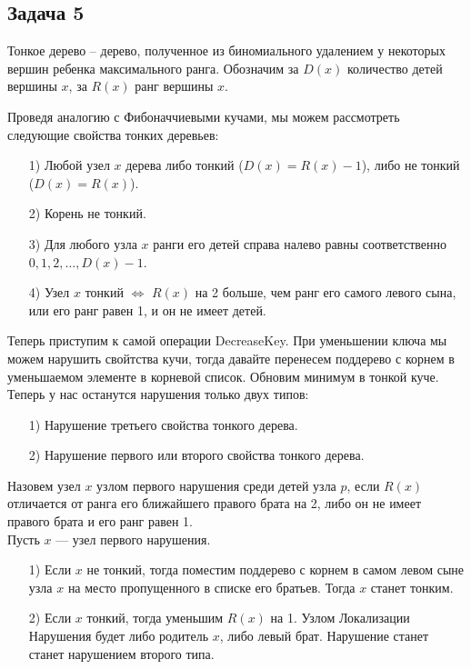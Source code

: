 \documentclass{article}
\begin{document}
	
	\subsection*{Задача 5}
	
	\tab Тонкое дерево -- дерево, полученное из биномиального удалением у некоторых вершин ребенка максимального ранга. Обозначим за $D(x)$ количество детей вершины $x$, за $R(x)$ ранг вершины $x$.
	
	Проведя аналогию с Фибоначчиевыми кучами, мы можем рассмотреть следующие свойства тонких деревьев:
	
	\begin{itemize}
	    \item[1)] Любой узел $x$ дерева либо тонкий ($D(x) = R(x) - 1$), либо не тонкий ($D(x) = R(x)$).
	    \item[2)] Корень не тонкий.
	    \item[3)] Для любого узла $x$ ранги его детей справа налево равны соответственно $0, 1, 2, \dots, D(x)-1$.
	    \item[4)] Узел $x$ тонкий $\Leftrightarrow$ $R(x)$ на 2 больше, чем ранг его самого левого сына, или его ранг равен 1, и он не имеет детей.
	\end{itemize}
	
	
	Теперь приступим к самой операции DecreaseKey.
	При уменьшении ключа мы можем нарушить свойтства кучи, тогда давайте перенесем поддерево с корнем в уменьшаемом элементе в корневой список. Обновим минимум в тонкой куче. \\
	
	Теперь у нас останутся нарушения только двух типов:
	\begin{itemize}
	    \item[1)] Нарушение третьего свойства тонкого дерева.
	    \item[2)] Нарушение первого или второго свойства тонкого дерева.
	\end{itemize}
	
	Назовем узел $x$ узлом первого нарушения среди детей узла $p$, если $R(x)$ отличается от ранга его ближайшего правого брата на 2, либо он не имеет правого брата и его ранг равен 1. \\

    Пусть $x$ — узел первого нарушения. 
	\begin{itemize}
	    \item[1)] Если $x$ не тонкий, тогда поместим поддерево с корнем в самом левом сыне узла $x$ на место пропущенного в списке его братьев. Тогда $x$ станет тонким.
	    \item[2)] Если $x$ тонкий, тогда уменьшим $R(x)$ на 1. Узлом Локализации Нарушения будет либо родитель $x$, либо левый брат. Нарушение станет станет нарушением второго типа.
	\end{itemize}
	
\end{document}
